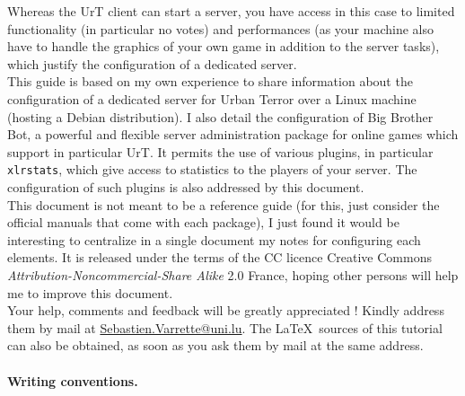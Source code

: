 Whereas the UrT client can start a server, you have  access in this case to
limited functionality (in particular no votes) and performances (as your machine
also have to handle the graphics of your own game in addition to the server
tasks), which justify the configuration of a dedicated server. \\

This guide is based on my own experience to share information about the
configuration of a dedicated server for Urban Terror over a Linux machine
(hosting a Debian distribution).
I also detail the configuration of Big Brother Bot, a powerful and flexible
server administration package for online games which support in particular UrT. 
It permits the use of various plugins, in particular \texttt{xlrstats}, which
give access to statistics to the players of your server. 
The configuration of such plugins is also addressed by this document. \\

This document is not meant to be a reference guide (for this, just consider the
official manuals that come with each package), I just found it would be
interesting to centralize in a single document my notes for configuring each
elements. 
It is released under the terms of the CC licence Creative Commons
\emph{Attribution-Noncommercial-Share Alike} 2.0 France, hoping other persons
will help me to improve this document. \\
Your help, comments and feedback will be greatly appreciated ! Kindly address
them by mail at \url{Sebastien.Varrette@uni.lu}. 
The \LaTeX\ sources of this tutorial can also be obtained, as soon as you
ask them by mail at the same address. 

\paragraph{Writing conventions.}

